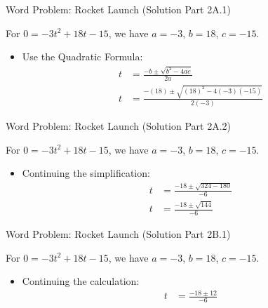 \documentclass[aspectratio=169]{beamer}
\begin{document}
\begin{frame}{Word Problem: Rocket Launch (Solution Part 2A.1)}
    \begin{tcolorbox}[colback=lightgray,colframe=accent,title=Solution Part 2A.1: Apply Quadratic Formula]
        \footnotesize
        For $0 = -3t^2 + 18t - 15$, we have $a=-3$, $b=18$, $c=-15$.
        \begin{itemize}
            \item Use the Quadratic Formula:
                \begin{align*}
                    t &= \frac{-b \pm \sqrt{b^2 - 4ac}}{2a} \\
                    t &= \frac{-(18) \pm \sqrt{(18)^2 - 4(-3)(-15)}}{2(-3)}
                \end{align*}
        \end{itemize}
    \end{tcolorbox}
\end{frame}

\begin{frame}{Word Problem: Rocket Launch (Solution Part 2A.2)}
    \begin{tcolorbox}[colback=lightgray,colframe=accent,title=Solution Part 2A.2: Simplify Quadratic Formula]
        \footnotesize
        For $0 = -3t^2 + 18t - 15$, we have $a=-3$, $b=18$, $c=-15$.
        \begin{itemize}
            \item Continuing the simplification:
                \begin{align*}
                    t &= \frac{-18 \pm \sqrt{324 - 180}}{-6} \\
                    t &= \frac{-18 \pm \sqrt{144}}{-6}
                \end{align*}
        \end{itemize}
    \end{tcolorbox}
\end{frame}

\begin{frame}{Word Problem: Rocket Launch (Solution Part 2B.1)}
    \begin{tcolorbox}[colback=lightgray,colframe=accent,title=Solution Part 2B.1: Calculate Values]
        \footnotesize
        For $0 = -3t^2 + 18t - 15$, we have $a=-3$, $b=18$, $c=-15$.
        \begin{itemize}
            \item Continuing the calculation:
                \begin{align*}
                    t &= \frac{-18 \pm 12}{-6}
                \end{align*}
        \end{itemize}
    \end{tcolorbox}
\end{frame}
\end{document}
